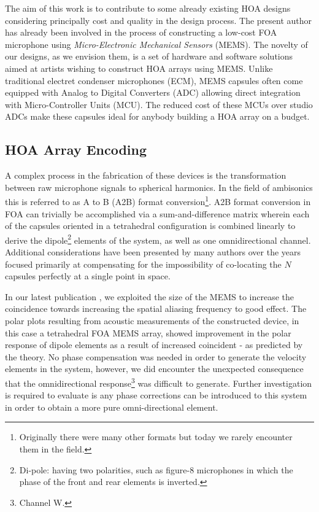 The aim of this work is to contribute to some already existing HOA designs considering principally cost and quality in the design process. The present author has already been involved in the process of constructing a low-cost FOA microphone using \textit{Micro-Electronic Mechanical Sensors} (MEMS). The novelty of our designs, as we envision them, is a set of hardware and software solutions aimed at artists wishing to construct HOA arrays using MEMS. Unlike traditional electret condenser microphones (ECM), MEMS capsules often come equipped with Analog to Digital Converters (ADC) allowing direct integration with Micro-Controller Units (MCU). The reduced cost of these MCUs over studio ADCs make these capsules ideal for anybody building a HOA array on a budget. 

\subsection{HOA Array Encoding}

A complex process in the fabrication of these devices is the transformation between raw microphone signals to spherical harmonics. In the field of ambisonics this is referred to as A to B (A2B) format conversion\footnote{Originally there were many other formats but today we rarely encounter them in the field.}. A2B format conversion in FOA can trivially be accomplished via a sum-and-difference matrix wherein each of the capsules oriented in a tetrahedral configuration is combined linearly to derive the dipole\footnote{Di-pole: having two polarities, such as figure-8 microphones in which the phase of the front and rear elements is inverted.} elements of the system, as well as one omnidirectional channel. Additional considerations have been presented by many authors over the years focused primarily at compensating for the impossibility of co-locating the $N$ capsules perfectly at a single point in space.

In our latest publication \cite{zalles2019effects}, we exploited the size of the MEMS to increase the coincidence towards increasing the spatial aliasing frequency to good effect. The polar plots resulting from acoustic measurements of the constructed device, in this case a tetrahedral FOA MEMS array, showed improvement in the polar response of dipole elements as a result of increased coincident - as predicted by the theory. No phase compensation was needed in order to generate the velocity elements in the system, however, we did encounter the unexpected consequence that the omnidirectional response\footnote{Channel W.} was difficult to generate. Further investigation is required to evaluate is any phase corrections can be introduced to this system in order to obtain a more pure omni-directional element.

